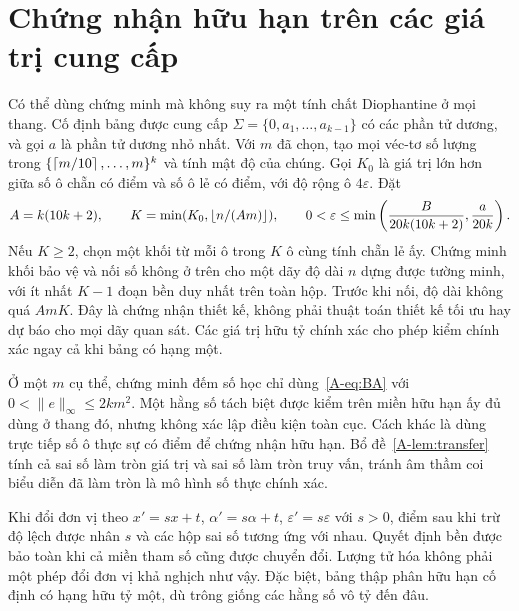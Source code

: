 \section{Chứng nhận hữu hạn trên các giá trị cung cấp}
Có thể dùng chứng minh mà không suy ra một tính chất Diophantine ở mọi thang. Cố định bảng được cung cấp $\Sigma=\{0,a_1,\ldots,a_{k-1}\}$ có các phần tử dương, và gọi $a$ là phần tử dương nhỏ nhất. Với $m$ đã chọn, tạo mọi véc-tơ số lượng trong $\{\left\lceil m/10\right\rceil,\ldots,m\}^k$ và tính mật độ của chúng. Gọi $K_0$ là giá trị lớn hơn giữa số ô chẵn có điểm và số ô lẻ có điểm, với độ rộng ô $4\varepsilon$. Đặt
\begin{equation}\label{A-eq:finite-design}
A=k(10k+2),\qquad K=\min(K_0,\left\lfloor n/(Am)\right\rfloor),\qquad
0<\varepsilon\le\min\left(\frac{B}{20k(10k+2)},\frac{a}{20k}\right).
\end{equation}
Nếu $K\ge2$, chọn một khối từ mỗi ô trong $K$ ô cùng tính chẵn lẻ ấy. Chứng minh khối bảo vệ và nối số không ở trên cho một dãy độ dài $n$ dựng được tường minh, với ít nhất $K-1$ đoạn bền duy nhất trên toàn hộp. Trước khi nối, độ dài không quá $AmK$. Đây là chứng nhận thiết kế, không phải thuật toán thiết kế tối ưu hay dự báo cho mọi dãy quan sát. Các giá trị hữu tỷ chính xác cho phép kiểm chính xác ngay cả khi bảng có hạng một.

Ở một $m$ cụ thể, chứng minh đếm số học chỉ dùng~\eqref{A-eq:BA} với $0<\|e\|_\infty\le2km^2$. Một hằng số tách biệt được kiểm trên miền hữu hạn ấy đủ dùng ở thang đó, nhưng không xác lập điều kiện toàn cục. Cách khác là dùng trực tiếp số ô thực sự có điểm để chứng nhận hữu hạn. Bổ đề~\ref{A-lem:transfer} tính cả sai số làm tròn giá trị và sai số làm tròn truy vấn, tránh âm thầm coi biểu diễn đã làm tròn là mô hình số thực chính xác.

Khi đổi đơn vị theo $x'=sx+t$, $\alpha'=s\alpha+t$, $\varepsilon'=s\varepsilon$ với $s>0$, điểm sau khi trừ độ lệch được nhân $s$ và các hộp sai số tương ứng với nhau. Quyết định bền được bảo toàn khi cả miền tham số cũng được chuyển đổi. Lượng tử hóa không phải một phép đổi đơn vị khả nghịch như vậy. Đặc biệt, bảng thập phân hữu hạn cố định có hạng hữu tỷ một, dù trông giống các hằng số vô tỷ đến đâu.
